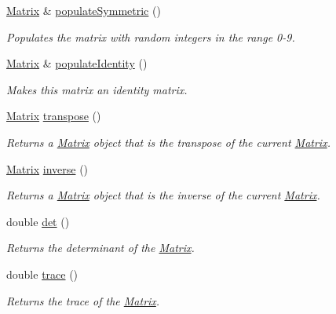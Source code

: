 \begin{DoxyCompactItemize}
\hyperlink{class_matrix}{Matrix} \& \hyperlink{class_matrix_abeb4729f525e85a0f1f516675677e105}{populateSymmetric} ()
\begin{DoxyCompactList}\small\item\em Populates the matrix with random integers in the range 0-\/9. \item\end{DoxyCompactList}\item 
\hyperlink{class_matrix}{Matrix} \& \hyperlink{class_matrix_a0ee71091770a4e83e54860f291ef1b7d}{populateIdentity} ()
\begin{DoxyCompactList}\small\item\em Makes this matrix an identity matrix. \item\end{DoxyCompactList}\item 
\hyperlink{class_matrix}{Matrix} \hyperlink{class_matrix_ae23f817021383e3c8636a714dcba1d21}{transpose} ()
\begin{DoxyCompactList}\small\item\em Returns a \hyperlink{class_matrix}{Matrix} object that is the transpose of the current \hyperlink{class_matrix}{Matrix}. \item\end{DoxyCompactList}\item 
\hyperlink{class_matrix}{Matrix} \hyperlink{class_matrix_ac4f5e7d4bb1bfd6586bd3384bd2a02b0}{inverse} ()
\begin{DoxyCompactList}\small\item\em Returns a \hyperlink{class_matrix}{Matrix} object that is the inverse of the current \hyperlink{class_matrix}{Matrix}. \item\end{DoxyCompactList}\item 
double \hyperlink{class_matrix_ace95025dd985ddaa6c1ed72e8b464a0a}{det} ()
\begin{DoxyCompactList}\small\item\em Returns the determinant of the \hyperlink{class_matrix}{Matrix}. \item\end{DoxyCompactList}\item 
double \hyperlink{class_matrix_af7403d8c02553a4fba253380e4e0bc40}{trace} ()
\begin{DoxyCompactList}\small\item\em Returns the trace of the \hyperlink{class_matrix}{Matrix}. \item\end{DoxyCompactList}\item 

\end{DoxyCompactItemize}

